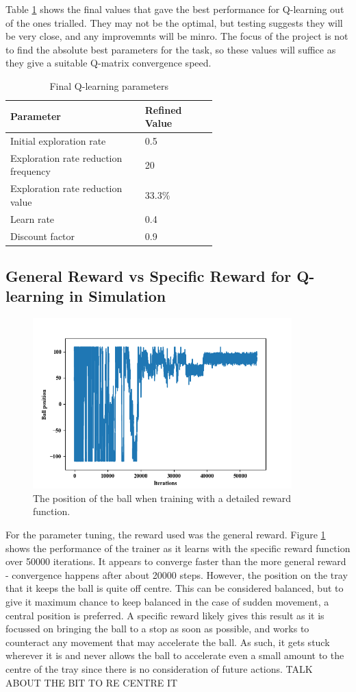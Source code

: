 \documentclass[12pt,a4paper]{article}
\begin{document}
Table \ref{q_params} shows the final values that gave the best performance for Q-learning out of the ones trialled. They may not be the optimal, but testing suggests they will be very close, and any improvemnts will be minro. The focus of the project is not to find the absolute best parameters for the task, so these values will suffice as they give a suitable Q-matrix convergence speed.
\begin{table}[htb]
\centering
\caption{Final Q-learning parameters}

\label{q_params}
\begin{tabular}{>{\raggedright}p{0.4\linewidth}p{0.2\linewidth}}\hline
Parameter & Refined Value\\ \hline\hline
Initial exploration rate & 0.5\\ \hline
Exploration rate reduction frequency & 20\\ \hline
Exploration rate reduction value & 33.3\% \\\hline
Learn rate & 0.4 \\\hline
Discount factor & 0.9 \\\hline
\end{tabular}
\end{table}


\subsection{General Reward vs Specific Reward for Q-learning in Simulation}
\begin{figure}[H]
	\centering
	\includegraphics[width=10cm]{157}
	\caption{The position of the ball when training with a detailed reward function.}
	\label{f5}
\end{figure}
For the parameter tuning, the reward used was the general reward. Figure \ref{f5} shows the performance of the trainer as it learns with the specific reward function over 50000 iterations. It appears to converge faster than the more general reward - convergence happens after about 20000 steps. However, the position on the tray that it keeps the ball is quite off centre. This can be considered balanced, but to give it maximum chance to keep balanced in the case of sudden movement, a central position is preferred. A specific reward likely gives this result as it is focussed on bringing the ball to a stop as soon as possible, and works to counteract any movement that may accelerate the ball. As such, it gets stuck wherever it is and never allows the ball to accelerate even a small amount to the centre of the tray since there is no consideration of future actions. TALK ABOUT THE BIT TO RE CENTRE IT
\end{document}
